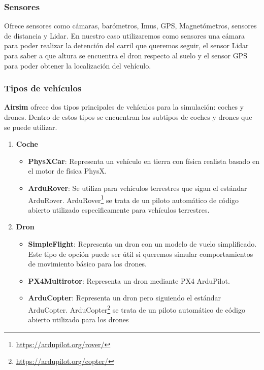 \subsubsection{Sensores}
\label{sec:airsim}
Ofrece sensores como cámaras, barómetros, Imus, GPS, Magnetómetros, sensores de distancia y Lidar.
En nuestro caso utilizaremos como sensores una cámara para poder realizar la detención del carril 
que queremos seguir, el sensor Lidar para saber a que altura se encuentra el dron respecto al suelo y el sensor
GPS para poder obtener la localización del vehículo. 

\subsubsection{Tipos de vehículos}
\label{sec:airsim}
\textbf{Airsim} ofrece dos tipos principales de vehículos para la simulación: coches y drones. Dentro de estos tipos se encuentran los subtipos de coches y drones que se puede utilizar.

\begin{enumerate}
  \item \textbf{Coche}
    \begin{itemize}
      \item \textbf{PhysXCar}: Representa un vehículo en tierra con física realista basado en el motor de física PhysX.
      \item \textbf{ArduRover}: Se utiliza para vehículos terrestres que sigan el estándar ArduRover. ArduRover\footnote{\url{https://ardupilot.org/rover/}} 
      se trata de un piloto automático de código abierto utilizado especificamente para vehículos terrestres.
      \newline
    \end{itemize}
    
  \item \textbf{Dron}
    \begin{itemize}
      \item \textbf{SimpleFlight}: Representa un dron con un modelo de vuelo simplificado. Este tipo de opción puede ser útil si queremos simular comportamientos 
      de movimiento básico para los drones.
      \item \textbf{PX4Multirotor}: Representa un dron mediante PX4 ArduPilot. 
      \item \textbf{ArduCopter}: Representa un dron pero siguiendo el estándar ArduCopter. ArduCopter\footnote{\url{https://ardupilot.org/copter/}} 
      se trata de un piloto automático de código abierto utilizado para los drones 
    \end{itemize}
  
\end{enumerate}

